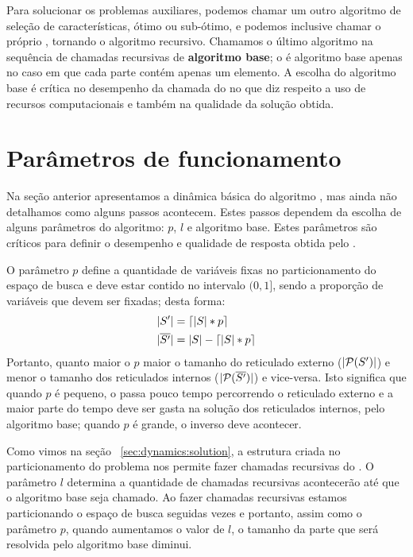 Para solucionar os problemas auxiliares, podemos chamar um outro 
algoritmo de seleção de características, ótimo ou sub-ótimo, e podemos 
inclusive chamar o próprio , tornando o algoritmo 
recursivo. Chamamos o último algoritmo na sequência de chamadas 
recursivas de {\bf algoritmo base}; o  é algoritmo base 
apenas no caso em que cada parte contém apenas um elemento. A escolha do
algoritmo base é crítica no desempenho da chamada do  
no que diz respeito a uso de recursos computacionais e também na 
qualidade da solução obtida.


\section{Parâmetros de funcionamento}
Na seção anterior apresentamos a dinâmica básica do algoritmo 
, mas ainda não detalhamos como alguns passos acontecem. 
Estes passos dependem da escolha de alguns parâmetros do algoritmo: $p$,
$l$ e algoritmo base. Estes parâmetros são críticos para definir o 
desempenho e qualidade de resposta obtida pelo .

O parâmetro $p$ define a quantidade de variáveis fixas no 
particionamento do espaço de busca e deve estar contido no intervalo 
$(0, 1]$, sendo a proporção de variáveis que devem ser fixadas; desta 
forma:
\begin{align*}
    |S'| & =  \lceil |S| * p \rceil \\
    |\overline{S'}| & = |S| - \lceil |S| * p \rceil \\
\end{align*}
Portanto, quanto maior o $p$ maior o tamanho do reticulado externo 
($|\mathcal{P} (S')|$) e menor o tamanho dos reticulados internos 
($|\mathcal{P}(\overline{S'})|$) e vice-versa. Isto significa que quando 
$p$ é pequeno, o  passa pouco tempo percorrendo o 
reticulado externo e a maior parte do tempo deve ser gasta na solução 
dos reticulados internos, pelo algoritmo base; quando $p$ é grande, o 
inverso deve acontecer.

Como vimos na seção ~\ref{sec:dynamics:solution}, a estrutura criada no
particionamento do problema nos permite fazer chamadas recursivas do 
. O parâmetro $l$ determina a quantidade de chamadas 
recursivas acontecerão até que o algoritmo base seja chamado. Ao fazer 
chamadas recursivas estamos particionando o espaço de busca seguidas 
vezes e portanto, assim como o parâmetro $p$, quando aumentamos o valor
de $l$, o tamanho da parte que será resolvida pelo algoritmo base 
diminui. 



